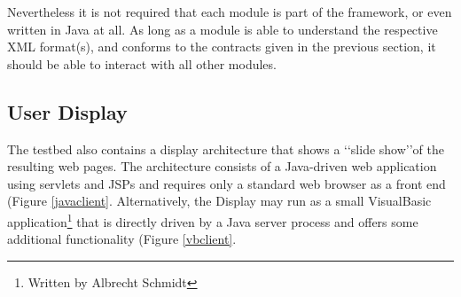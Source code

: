 \documentclass[a4paper]{danarticle}
\theoremstyle{remark}
\begin{document}
      Nevertheless it is not required that each module is part of the 
      framework, or even written in Java at all. As long as a module is able to 
      understand the respective XML format(s), and conforms to the contracts 
      given in the previous section, it should be able to interact with all 
      other modules.
    \subsection{User Display}
      The testbed also contains a display architecture that shows a \lq\lq slide
      show\rq\rq of the resulting web pages. The architecture consists of a
      Java-driven web application using servlets and JSPs and requires only a
      standard web browser as a front end (Figure \ref{javaclient}. 
      Alternatively, the Display may run as
      a small VisualBasic application\footnote{Written
      by Albrecht Schmidt} that is directly driven by a Java server
      process and offers some additional functionality (Figure \ref{vbclient}.
      
\end{document}
